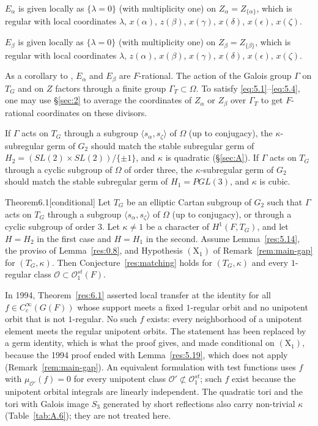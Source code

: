 \documentclass[12pt,letterpaper]{amsart}
\theoremstyle{plain}
\theoremstyle{definition}
\theoremstyle{remark}
\theoremstyle{definition}
\begin{document}
$E_\alpha$ is given locally as $\{\lambda =0\}$
(with multiplicity one) on $Z_\alpha=Z_{\{\alpha\}}$,
which is regular with local coordinates
$\lambda$, $x(\alpha)$, $z(\beta)$, $x(\gamma)$,
$x(\delta)$, $x(\epsilon)$, $x(\zeta)$.

$E_\beta$ is given locally as $\{\lambda =0\}$ (with multiplicity one)
on $Z_\beta=Z_{\{\beta\}}$,
which is regular with local coordinates
$\lambda$, $z(\alpha)$, $x(\beta)$, $x(\gamma)$,
$x(\delta)$, $x(\epsilon)$, $x(\zeta)$.

As a corollary to \cite[Ch.~VI, Lemma~1.1]{Ha92a},
$E_\alpha$ and $E_\beta$ are $F$-rational. The action of the Galois
group $\Gamma$ on $T_G$ and on $Z$ factors through a finite group
$\Gamma_{T}\subset \Omega$.
To satisfy \eqref{eq:5.1}--\eqref{eq:5.4}, one may use
\S\ref{sec:2} to average the coordinates of $Z_\alpha$ or
$Z_\beta$ over $\Gamma_T$
to get $F$-rational coordinates on these divisors.

If $\Gamma$ acts on $T_G$ through a subgroup $\langle s_\alpha,s_\zeta\rangle$
of $\Omega$ (up to conjugacy), the $\kappa$-subregular germ
of $G_2$ should match the stable subregular germ of
$H_2=(SL(2)\times SL(2))/\{\pm 1\}$, and $\kappa$ is quadratic
(\S\ref{sec:A}). If $\Gamma$ acts on $T_G$
through a cyclic subgroup of $\Omega$ of order three,
the $\kappa$-subregular germ
of $G_2$ should match the stable subregular germ of
$H_1=PGL(3)$, and $\kappa$ is cubic.

\begin{res}{Theorem}{6.1}[conditional]\label{res:6.1}
Let $T_G$ be an elliptic Cartan subgroup
of $G_2$ such that $\Gamma$ acts on $T_G$ through
a subgroup $\langle s_\alpha,s_\zeta\rangle$ of $\Omega$ (up to conjugacy),
or through a cyclic subgroup of order $3$. Let $\kappa\neq1$ be a character of
$H^1(F,T_G)$, and let $H=H_2$ in the first case and $H=H_1$ in the second.
Assume Lemma~\ref{res:5.14}, the proviso of Lemma~\ref{res:0.8}, and
Hypothesis $(\mathrm X_1)$ of Remark~\ref{rem:main-gap} for $(T_G,\kappa)$.
Then Conjecture~\ref{res:matching} holds for $(T_G,\kappa)$ and every
$1$-regular class $\mathcal O\subset\mathcal O_1^{st}(F)$.
\end{res}

\begin{rem26}\label{rem:6.1}
In 1994, Theorem~\ref{res:6.1} asserted local transfer at the identity for
all $f\in C_c^\infty(G(F))$ whose support meets a fixed $1$-regular orbit
and no unipotent orbit that is not $1$-regular. No such $f$ exists: every
neighborhood of a unipotent element meets the regular unipotent orbits. The
statement has been replaced by a germ identity, which is what the proof
gives, and made conditional on $(\mathrm X_1)$, because the 1994 proof ended
with Lemma~\ref{res:5.19}, which does not apply
(Remark~\ref{rem:main-gap}). An equivalent formulation with test functions
uses $f$ with $\mu_{\mathcal O'}(f)=0$ for every unipotent class
$\mathcal O'\not\subset\mathcal O_1^{st}$; such $f$ exist because the
unipotent orbital integrals are linearly independent. The quadratic tori and
the tori with Galois image $S_3$ generated by short reflections also carry
non-trivial $\kappa$ (Table~\ref{tab:A.6}); they are not treated here.
\end{rem26}
\end{document}
